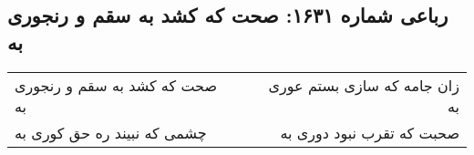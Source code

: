 \begin{center}
\section*{رباعی شماره ۱۶۳۱: صحت که کشد به سقم و رنجوری به}
\label{sec:1631}
\begin{longtable}{l p{0.5cm} r}
صحت که کشد به سقم و رنجوری به
&&
زان جامه که سازی بستم عوری به
\\
چشمی که نبیند ره حق کوری به
&&
صحبت که تقرب نبود دوری به
\\
\end{longtable}
\end{center}
